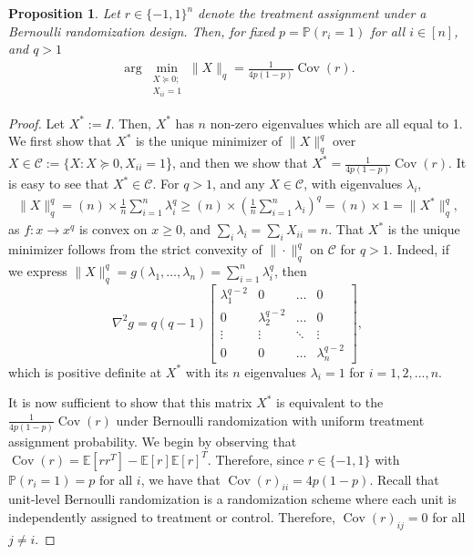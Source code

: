 \documentclass[12pt]{article}
\newtheorem{proposition}[theorem]{Proposition}
\theoremstyle{definition}
\numberwithin{equation}{section}
\numberwithin{figure}{section}
\numberwithin{equation}{section}
\numberwithin{figure}{section}
\begin{document}
\begingroup
\renewcommand{\theproposition}{\ref{prop:X_norm_covariance_min}}
\begin{proposition}
Let $r \in \{-1,1\}^n$ denote the treatment assignment under a Bernoulli randomization design. Then, for fixed $p= \mathbb{P}(r_i = 1)$ for all $i \in [n]$, and $q>1$
    \begin{align*}
        \arg \min_{\substack{X \succeq 0; \\ X_{ii}=1}} \|X\|_{q} = \frac{1}{4p(1-p)} \operatorname{Cov}(r).
    \end{align*}
\end{proposition}
\addtocounter{proposition}{-1}
\endgroup

\begin{proof}[Proof]
    Let $X^* := I.$ Then, $X^*$ has $n$ non-zero eigenvalues which are all equal to 1. 
    We first show that $X^*$ is the unique minimizer of $\|X\|_{q}^{q}$ over $X\in \mathcal{C}:= \{X:X \succeq 0, X_{ii}=1$\}, and then we show that $X^* = \frac{1}{4p(1-p)} \operatorname{Cov}(r).$ 
    It is easy to see that $X^* \in \mathcal{C}$. For $q > 1$, and any $X\in\mathcal{C}$, with eigenvalues $\lambda_i$, 
    \begin{align*}
       \|X\|_{q}^{q} = (n) \times  \frac{1}{n} \sum_{i=1}^n \lambda_i^{q}  \geq (n) \times  (\frac{1}{n} \sum_{i=1}^n \lambda_i)^{q} = (n) \times  1 = \|X^*\|_{q}^{q},
    \end{align*}
    as $ f: x \to x^{q}$ is convex on $x\geq 0$, and $\sum_i \lambda_i = \sum_i X_{ii} = n$. That $X^*$ is the unique minimizer follows from the strict convexity of $\| \cdot \|_{q}^{q}$ on $\mathcal{C}$ for $q > 1$. 
    Indeed, if we express $\|X\|_{q}^{q} = g(\lambda_1,\dots,\lambda_{n}) = \sum_{i=1}^{n} \lambda_i^{q}$,
    then 
    \[
    \nabla^2 g = q(q-1) 
    \begin{bmatrix}
    \lambda_1^{q-2} & 0 & \dots & 0\\
    0 & \lambda_2^{q-2} & \dots & 0\\
    \vdots & \vdots & \ddots & \vdots \\
    0 & 0 & \dots & \lambda_{n}^{q-2}
    \end{bmatrix},
    \]
    which is positive definite at $X^*$ with its $n$ eigenvalues $\lambda_i = 1$ for $i = 1, 2, ..., n$.

    It is now sufficient to show that this matrix $X^*$ is equivalent to the $ \frac{1}{4p(1-p)}\operatorname{Cov}(r)$ under Bernoulli randomization with uniform treatment assignment probability. We begin by observing that $\operatorname{Cov}(r) = \mathbb{E}[rr^T] - \mathbb{E}[r]\mathbb{E}[r]^T$. Therefore, since $r \in \{-1,1\}$ with $\mathbb{P}(r_i = 1) = p$ for all $i$, we have that $\operatorname{Cov}(r)_{ii} = 4p(1-p)$. Recall that unit-level Bernoulli randomization is a randomization scheme where each unit is independently assigned to treatment or control. Therefore, $\operatorname{Cov}(r)_{ij} = 0$ for all $j \neq i$. 
\end{proof}
\end{document}
